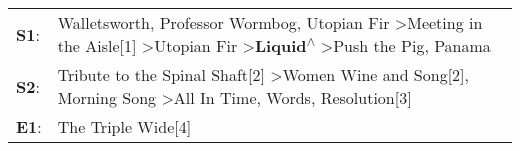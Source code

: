 \begin{supertabular}{p{0.03\textwidth}p{0.92\textwidth}}
 \textbf{S1}:  &  Walletsworth\textsuperscript{}, \enspace Professor Wormbog\textsuperscript{}, \enspace Utopian Fir\textsuperscript{} \textgreater \enspace Meeting in the Aisle[1]\textsuperscript{} \textgreater \enspace Utopian Fir\textsuperscript{} \textgreater \enspace \textbf{Liquid\textsuperscript{$\wedge$}} \textgreater \enspace Push the Pig\textsuperscript{}, \enspace Panama\textsuperscript{}  \enspace  \\
 \textbf{S2}:  &                                                                                                          Tribute to the Spinal Shaft[2]\textsuperscript{} \textgreater \enspace Women Wine and Song[2]\textsuperscript{}, \enspace Morning Song\textsuperscript{} \textgreater \enspace All In Time\textsuperscript{}, \enspace Words\textsuperscript{}, \enspace Resolution[3]\textsuperscript{}  \enspace  \\
 \textbf{E1}:  &                                                                                                                                                                                                                                                                                                                                                              The Triple Wide[4]\textsuperscript{}  \enspace  \\
\end{supertabular}
